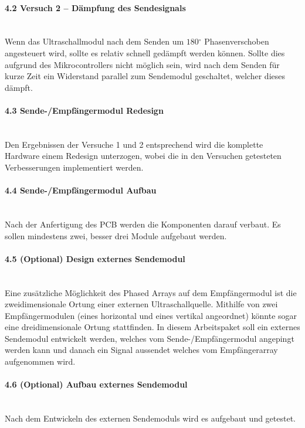 \documentclass[10pt,a4paper,oneside]{99_fhnwreport}
\begin{document}
\paragraph{4.2 Versuch 2 -- Dämpfung des Sendesignals}\\
Wenn das Ultraschallmodul nach dem Senden um $180 \mathrm{^{\circ}}$ Phasenverschoben angesteuert wird, sollte es relativ schnell gedämpft werden können. Sollte dies aufgrund des Mikrocontrollers nicht möglich sein, wird nach dem Senden für kurze Zeit ein Widerstand parallel zum Sendemodul geschaltet, welcher dieses dämpft.

\paragraph{4.3 Sende-/Empfängermodul Redesign}\\
Den Ergebnissen der Versuche 1 und 2 entsprechend wird die komplette Hardware einem Redesign unterzogen, wobei die in den Versuchen getesteten Verbesserungen implementiert werden.

\paragraph{4.4 Sende-/Empfängermodul Aufbau}\\
Nach der Anfertigung des PCB werden die Komponenten darauf verbaut. Es sollen mindestens zwei, besser drei Module aufgebaut werden.

\paragraph{4.5 (Optional) Design externes Sendemodul}\\
Eine zusätzliche Möglichkeit des Phased Arrays auf dem Empfängermodul ist die zweidimensionale Ortung einer externen Ultraschallquelle. Mithilfe von zwei Empfängermodulen (eines horizontal und eines vertikal angeordnet) könnte sogar eine dreidimensionale Ortung stattfinden. In diesem Arbeitspaket soll ein externes Sendemodul entwickelt werden, welches vom Sende-/Empfängermodul angepingt werden kann und danach ein Signal aussendet welches vom Empfängerarray aufgenommen wird.

\paragraph{4.6 (Optional) Aufbau externes Sendemodul}\\
Nach dem Entwickeln des externen Sendemoduls wird es aufgebaut und getestet.
\end{document}
